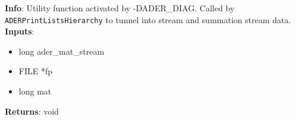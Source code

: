 \textbf{Info}: Utility function activated by -DADER\_DIAG. Called by
\texttt{ADERPrintListsHierarchy} to tunnel into stream and summation stream
data.\\

\noindent \textbf{Inputs}:
\begin{itemize}
\item{long ader\_mat\_stream}
\item{FILE *fp}
\item{long mat}
\end{itemize}

\noindent \textbf{Returns}: void
